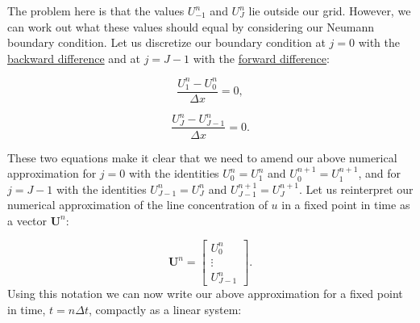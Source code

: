 \documentclass[../summary.tex]{subfiles}
\begin{document}
The problem here is that the values $U_{-1}^n$ and $U_J^n$ lie outside our grid.
However, we can work out what these values should equal by considering our Neumann boundary condition.
Let us discretize our boundary condition at $j=0$ with the \href{http://en.wikipedia.org/wiki/Finite_difference#Forward.2C_backward.2C_and_central_differences}{backward difference} and
at $j=J-1$ with the \href{http://en.wikipedia.org/wiki/Finite_difference#Forward.2C_backward.2C_and_central_differences}{forward difference}:

\begin{equation}
    \frac{U_1^n - U_0^n}{\Delta x} = 0,
\end{equation}

\begin{equation}
    \frac{U_J^n - U_{J-1}^n}{\Delta x} = 0.
\end{equation}

These two equations make it clear that we need to amend our above numerical approximation for
$j=0$ with the identities $U_0^n = U_1^n$ and $U_0^{n+1} = U_1^{n+1}$, and
for $j=J-1$ with the identities $U_{J-1}^n = U_J^n$ and $U_{J-1}^{n+1} = U_J^{n+1}$.
Let us reinterpret our numerical approximation of the line concentration of $u$ in a fixed point in time as a vector $\mathbf{U}^n$:

\begin{equation}
    \mathbf{U}^n = 
\begin{bmatrix} U_0^n \\ \vdots \\ U_{J-1}^n \end{bmatrix}.
\end{equation}
Using this notation we can now write our above approximation for a fixed point in time, $t = n \Delta t$, compactly as a linear system:
\end{document}
